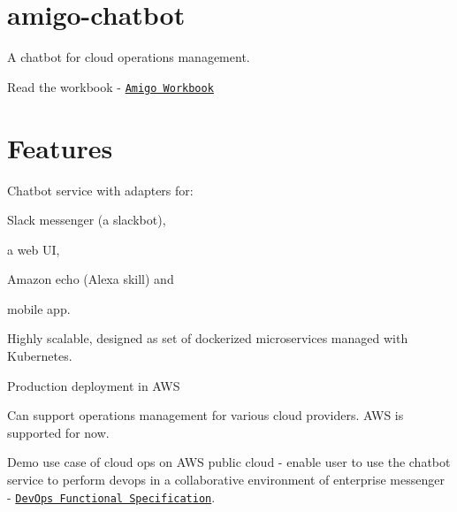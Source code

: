 \href{https://app.shippable.com/projects/58b94166ac9c0b0600a8b21c}{\tt } \section*{amigo-\/chatbot}

A chatbot for cloud operations management.

Read the workbook -\/ \href{https://1drv.ms/w/s!AnGP6YY6ad9FgYNR5g2UbP14Sp2GqA}{\tt Amigo Workbook}

\section*{Features}


\begin{DoxyEnumerate}
\item Chatbot service with adapters for\+:
\begin{DoxyItemize}
\item Slack messenger (a slackbot),
\item a web UI,
\item Amazon echo (Alexa skill) and
\item mobile app.
\end{DoxyItemize}
\item Highly scalable, designed as set of dockerized microservices managed with Kubernetes.
\item Production deployment in A\+WS
\item Can support operations management for various cloud providers. A\+WS is supported for now.
\item Demo use case of cloud ops on A\+WS public cloud -\/ enable user to use the chatbot service to perform devops in a collaborative environment of enterprise messenger -\/ \href{https://1drv.ms/b/s!AnGP6YY6ad9FgYN1jLX4QRvzE--Ybw}{\tt Dev\+Ops Functional Specification}. 
\end{DoxyEnumerate}